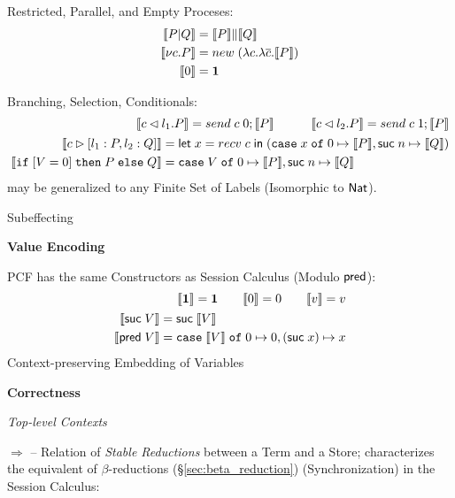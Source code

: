 Restricted, Parallel, and Empty Proceses:
\begin{align*}
  \llbracket{P|Q}\rrbracket
    & = \llbracket{P}\rrbracket \| \llbracket{Q}\rrbracket \\
  \llbracket{\nu c.P}\rrbracket
    & = new\;(\lambda c.\lambda \overline{c}.\llbracket{P}\rrbracket) \\
  \llbracket{0}\rrbracket & = \mathbf{1}
\end{align*}

Branching, Selection, Conditionals:
\[
\begin{split}
  \llbracket{c \lhd l_1.P}\rrbracket
    = send\;c\;0; \llbracket{P}\rrbracket
  \quad\quad\quad
  \llbracket{c \lhd l_2.P}\rrbracket
    = send\;c\;1; \llbracket{P}\rrbracket \\
  \begin{split}
    \llbracket{c \rhd [l_1:P,l_2:Q]}\rrbracket
      & = \mathsf{let}\; x = recv\;c \;\mathsf{in}\;
        (\mathtt{case}\; x \;\mathtt{of}\; 0 \mapsto \llbracket{P}\rrbracket,
        \mathsf{suc}\;n \mapsto \llbracket{Q}\rrbracket) \\
    \llbracket{\mathtt{if}\;[V=0]\;\mathtt{then}
        \;P\;\mathtt{else}\;Q}\rrbracket
      & = \mathtt{case}\; V \;\mathtt{of}\; 0 \mapsto \llbracket{P}\rrbracket,
        \mathsf{suc}\;n \mapsto \llbracket{Q}\rrbracket
  \end{split}
\end{split}
\]
may be generalized to any Finite Set of Labels (Isomorphic to $\mathsf{Nat}$).

Subeffecting %


\textbf{Value Encoding}

PCF has the same Constructors as Session Calculus (Modulo $\mathsf{pred}$):
\[
  \begin{split}
    \llbracket{\mathbf{1}}\rrbracket = \mathbf{1} \quad\quad
    \llbracket{0}\rrbracket = 0 \quad\quad
    \llbracket{v}\rrbracket = v \\
    \begin{split}
      \llbracket{\mathsf{suc}\;V}\rrbracket & = \mathsf{suc}\;\llbracket{V}\rrbracket \\
      \llbracket{\mathsf{pred}\;V}\rrbracket & =
        \mathtt{case}\;\llbracket{V}\rrbracket\;\mathtt{of}\;
          0 \mapsto 0, (\mathsf{suc}\;x) \mapsto x
    \end{split}
  \end{split}
\]
Context-preserving Embedding of Variables


\textbf{Correctness}

\emph{Top-level Contexts}

$\Rightarrow$ -- Relation of \emph{Stable Reductions} between a Term
and a Store; characterizes the equivalent of $\beta$-reductions
(\S\ref{sec:beta_reduction}) (Synchronization) in the Session
Calculus:

